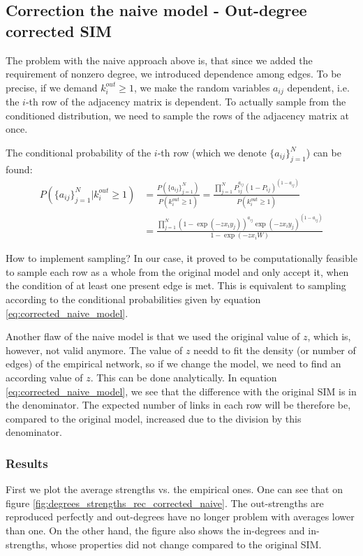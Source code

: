 \subsection{Correction the naive model - Out-degree corrected SIM}

The problem with the naive approach above is, that since we added the requirement of nonzero degree, we introduced dependence among edges. To be precise, if we demand $k_i^{out}\geq 1$, we make the random variables ${a_{ij}}$ dependent, i.e. the $i$-th row of the adjacency matrix is dependent. To actually sample from the conditioned distribution, we need to sample the rows of the adjacency matrix at once.

The conditional probability of the $i$-th row (which we denote $\{a_{ij}\}_{j=1}^N$) can be found:
\begin{align}
    P\left(\{a_{ij}\}_{j=1}^N|k_i^{out}\geq 1\right)
    &= \frac{P\left(\{a_{ij}\}_{j=1}^N\right)}{P(k_i^{out}\geq 1)} = \frac{ \prod_{j=1}^N P_{ij}^{a_{ij}}(1-P_{ij})^{(1-a_{ij})} }{P(k_i^{out}\geq 1)} \\
    &= \frac{ \prod_{j=1}^N (1 - \exp(-z x_i y_j))^{a_{ij}}\exp(-z x_i y_j)^{(1-a_{ij})} }{1 - \exp(-zx_i W)}
    \label{eq:corrected_naive_model}
\end{align}

How to implement sampling? In our case, it proved to be computationally feasible to sample each row as a whole from the original model and only accept it, when the condition of at least one present edge is met. This is equivalent to sampling according to the conditional probabilities given by equation \ref*{eq:corrected_naive_model}. 

Another flaw of the naive model is that we used the original value of $z$, which is, however, not valid anymore. The value of $z$ needd to fit the density (or number of edges) of the empirical network, so if we change the model, we need to find an according value of $z$. This can be done analytically. In equation \ref*{eq:corrected_naive_model}, we see that the difference with the original SIM is in the denominator. The expected number of links in each row will be therefore be, compared to the original model, increased due to the division by this denominator. 




\subsubsection{Results}
First we plot the average strengths vs. the empirical ones. One can see that on figure \ref*{fig:degrees_strengths_rec_corrected_naive}. The out-strengths are reproduced perfectly and out-degrees have no longer problem with averages lower than one. On the other hand, the figure also shows the in-degrees and in-strengths, whose properties did not change compared to the original SIM.

